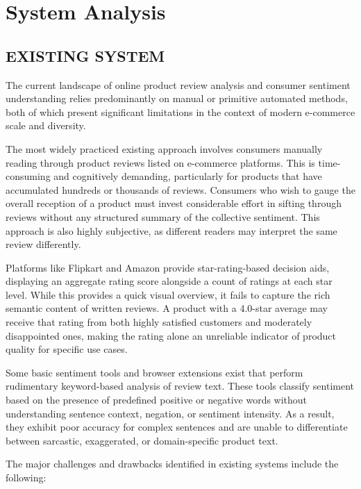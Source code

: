 \documentclass[12pt,a4paper]{report}
\begin{document}
\chapter{System Analysis}

\section{EXISTING SYSTEM}

The current landscape of online product review analysis and consumer sentiment understanding relies predominantly on manual or primitive automated methods, both of which present significant limitations in the context of modern e-commerce scale and diversity.

The most widely practiced existing approach involves consumers manually reading through product reviews listed on e-commerce platforms. This is time-consuming and cognitively demanding, particularly for products that have accumulated hundreds or thousands of reviews. Consumers who wish to gauge the overall reception of a product must invest considerable effort in sifting through reviews without any structured summary of the collective sentiment. This approach is also highly subjective, as different readers may interpret the same review differently.

Platforms like Flipkart and Amazon provide star-rating-based decision aids, displaying an aggregate rating score alongside a count of ratings at each star level. While this provides a quick visual overview, it fails to capture the rich semantic content of written reviews. A product with a 4.0-star average may receive that rating from both highly satisfied customers and moderately disappointed ones, making the rating alone an unreliable indicator of product quality for specific use cases.

Some basic sentiment tools and browser extensions exist that perform rudimentary keyword-based analysis of review text. These tools classify sentiment based on the presence of predefined positive or negative words without understanding sentence context, negation, or sentiment intensity. As a result, they exhibit poor accuracy for complex sentences and are unable to differentiate between sarcastic, exaggerated, or domain-specific product text.

The major challenges and drawbacks identified in existing systems include the following:
\end{document}
